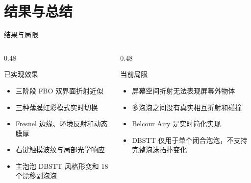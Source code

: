 \documentclass[11pt,aspectratio=169]{beamer}
\begin{document}
\section{结果与总结}

\begin{frame}{结果与局限}
  \begin{columns}[T]
    \begin{column}{0.48\linewidth}
      \begin{block}{已实现效果}
        \begin{itemize}
          \item 三阶段 FBO 双界面折射近似
          \item 三种薄膜虹彩模式实时切换
          \item Fresnel 边缘、环境反射和动态膜厚
          \item 右键触摸波纹与局部光学响应
          \item 主泡泡 DBSTT 风格形变和 18 个漂移副泡泡
        \end{itemize}
      \end{block}
    \end{column}
    \begin{column}{0.48\linewidth}
      \begin{block}{当前局限}
        \begin{itemize}
          \item 屏幕空间折射无法表现屏幕外物体
          \item 多泡泡之间没有真实相互折射和碰撞
          \item Belcour Airy 是实时简化实现
          \item DBSTT 仅用于单个闭合泡泡，不支持完整泡沫拓扑变化
        \end{itemize}
      \end{block}
    \end{column}
  \end{columns}
\end{frame}
\end{document}
